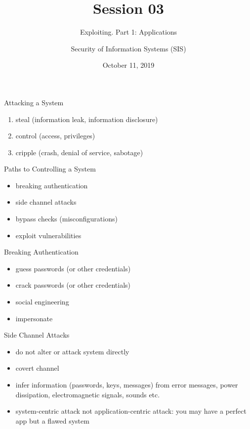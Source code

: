 \documentclass{curs}
\title[Session 03]{Session 03}
\subtitle{Exploiting. Part 1: Applications}
\author{Security of Information Systems (SIS)}
\date{October 11, 2019}
\begin{document}
\frame{\titlepage}

\begin{frame}{Attacking a System}
  \begin{enumerate}
    \pause \item steal (information leak, information disclosure)
    \pause \item control (access, privileges)
    \pause \item cripple (crash, denial of service, sabotage)
  \end{enumerate}
\end{frame}

\begin{frame}{Paths to Controlling a System}
  \begin{itemize}
    \pause \item breaking authentication
    \pause \item side channel attacks
    \pause \item bypass checks (misconfigurations)
    \pause \item exploit vulnerabilities
  \end{itemize}
\end{frame}

\begin{frame}{Breaking Authentication}
  \begin{itemize}
    \pause \item guess passwords (or other credentials)
    \pause \item crack passwords (or other credentials)
    \pause \item social engineering
    \pause \item impersonate
  \end{itemize}
\end{frame}

\begin{frame}{Side Channel Attacks}
  \begin{itemize}
    \pause \item do not alter or attack system directly
    \pause \item covert channel
    \pause \item infer information (passwords, keys, messages) from error messages, power dissipation, electromagnetic signals, sounds etc.
    \pause \item system-centric attack not application-centric attack: you may have a perfect app but a flawed system
  \end{itemize}
\end{frame}
\end{document}
